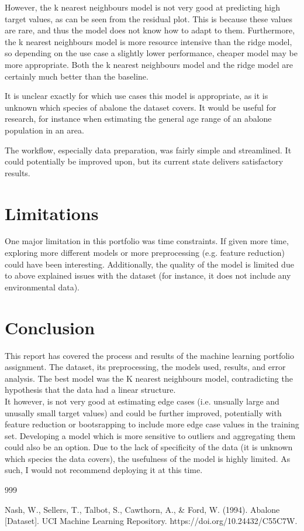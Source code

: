\documentclass[a4paper, 12pt]{article}
\begin{document}
However, the k nearest neighbours model is not very good at predicting high target values, as can be seen from the residual plot. This is because these values are rare, and thus the model does not know how to adapt to them.
Furthermore, the k nearest neighbours model is more resource intensive than the ridge model, so depending on the use case a slightly lower performance, cheaper model may be more appropriate.
Both the k nearest neighbours model and the ridge model are certainly much better than the baseline.

It is unclear exactly for which use cases this model is appropriate, as it is unknown which species of abalone the dataset covers. 
It would be useful for research, for instance when estimating the general age range of an abalone population in an area. 

The workflow, especially data preparation, was fairly simple and streamlined. It could potentially be improved upon, but its current state delivers satisfactory results.

\section{Limitations}
One major limitation in this portfolio was time constraints. If given more time, exploring more different models or more preprocessing (e.g. feature reduction) could have been interesting. Additionally, the quality of the model is limited due to above explained issues with the dataset (for instance, it does not include any environmental data).  

\section{Conclusion}
This report has covered the process and results of the machine learning portfolio assignment. The dataset, its preprocessing, the models used, results, and error analysis. The best model was the K nearest neighbours model, contradicting the hypothesis that the data had a linear structure. \\
It however, is not very good at estimating edge cases (i.e. unsually large and unusally small target values) and could be further improved, potentially with feature reduction or bootsrapping to include more edge case values in the training set. Developing a model which is more sensitive to outliers and aggregating them could also be an option.
Due to the lack of specificity of the data (it is unknown which species the data covers), the usefulness of the model is highly limited. As such, I would not recommend deploying it at this time. 

\begin{thebibliography}{999}

  Nash, W., Sellers, T., Talbot, S., Cawthorn, A., \& Ford, W. (1994). 
  Abalone [Dataset]. UCI Machine Learning Repository. https://doi.org/10.24432/C55C7W.
\end{thebibliography}
\end{document}
